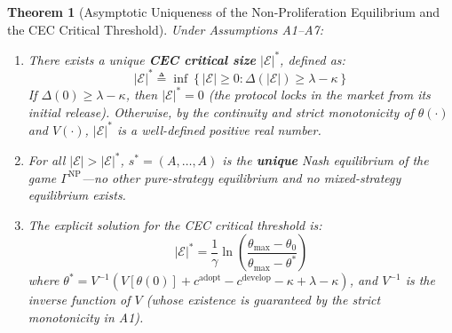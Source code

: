 \documentclass[12pt,a4paper]{article}
\newtheorem{theorem}{Theorem}[section]
\theoremstyle{definition}
\theoremstyle{remark}
\begin{document}
\begin{theorem}[Asymptotic Uniqueness of the Non-Proliferation Equilibrium and the CEC Critical Threshold]
\label{thm:asymptotic-uniqueness}
Under Assumptions A1--A7:

\begin{enumerate}[label=(\roman*)]
\item There exists a unique \textbf{CEC critical size} $|\mathcal{E}|^*$, defined as:
\begin{equation}
|\mathcal{E}|^* \triangleq \inf\left\{|\mathcal{E}| \geq 0 : \Delta(|\mathcal{E}|) \geq \lambda - \kappa\right\}
\label{eq:E-star}
\end{equation}
If $\Delta(0) \geq \lambda - \kappa$, then $|\mathcal{E}|^* = 0$ (the protocol locks in the market from its initial release). Otherwise, by the continuity and strict monotonicity of $\theta(\cdot)$ and $V(\cdot)$, $|\mathcal{E}|^*$ is a well-defined positive real number.

\item For all $|\mathcal{E}| > |\mathcal{E}|^*$, $s^* = (A, \ldots, A)$ is the \textbf{unique} Nash equilibrium of the game $\Gamma^{\text{NP}}$—no other pure-strategy equilibrium and no mixed-strategy equilibrium exists.

\item The explicit solution for the CEC critical threshold is:
\begin{equation}
|\mathcal{E}|^* = \frac{1}{\gamma} \ln \left( \frac{\theta_{\max} - \theta_0}{\theta_{\max} - \theta^*} \right)
\end{equation}
where $\theta^* = V^{-1}\left(V[\theta(0)] + c^{\text{adopt}} - c^{\text{develop}} - \kappa + \lambda - \kappa\right)$, and $V^{-1}$ is the inverse function of $V$ (whose existence is guaranteed by the strict monotonicity in A1).
\end{enumerate}
\end{theorem}
\end{document}
